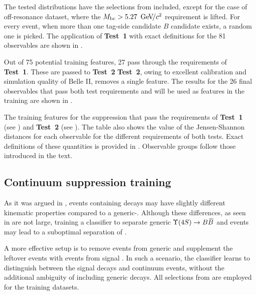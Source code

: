 The tested distributions have the selections from  included, except for the case of off-resonance dataset, where the ${M_{\mathrm{bc}}}>5.27~{\mathrm{\,Ge\kern -0.1em V\!/}c^2}$ requirement is lifted.
For every event, when more than one tag-side candidate $B$ candidate exists, a random one is picked.
The application of \textbf{Test~1} with exact definitions for the 81 observables are shown in .

Out of 75 potential training features, 27 pass through the requirements of \textbf{Test~1}.
These are passed to \textbf{Test~2}
\textbf{Test~2}, owing to excellent calibration and simulation quality of Belle II, removes a single feature.
The results for the 26 final observables that pass both test requirements and will be used as features in the \BDT training
are shown in .

\begin{table}[htbp!]
    \centering
    \caption{\label{tab:passing_test1}The training features for the \epem\ra\qqbar suppression
    that pass the requirements of \textbf{Test~1} (see ) and \textbf{Test~2} (see ).
    The table also shows the value of the Jensen-Shannon distances for each observable for the different requirements of both tests.
    Exact definitions of these quantities is provided in .
    Observable groups follow those introduced in the text.
    }   
    
\end{table}

\subsection{Continuum suppression training}\label{sec:continuum_training}

As it was argued in , events containing \BtoXsgamma decays may have slightly different kinematic properties compared to a generic-\BB.
Although these differences, as seen in  are not large, training a classifier to separate generic $\FourS\ra\BB$ and \epem\ra\qqbar events may lead to a suboptimal separation of \BtoXsgamma.

A more effective setup is to remove \BB events from generic \MC and supplement the leftover events with \BtoXsgamma events from signal \MC. 
In such a scenario, the classifier learns to distinguish between the signal decays and continuum events, without the additional ambiguity of including generic \BB decays.
All selections from  are employed for the training datasets.

